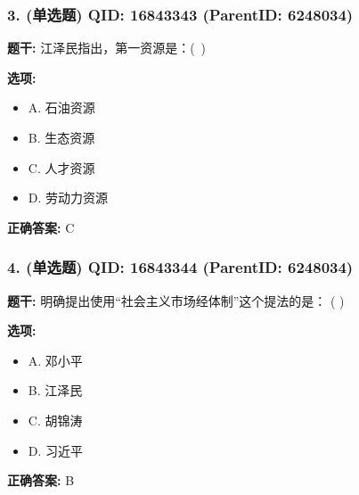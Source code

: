 \documentclass[12pt,UTF8]{ctexart}
\begin{document}
\vspace{0.3em}\hrulefill\vspace{0.7em}

\subsubsection*{3. (单选题) \small QID: 16843343 (ParentID: 6248034)}

\textbf{题干:}
江泽民指出，第一资源是：( )



\textbf{选项:}
\begin{itemize}[leftmargin=*]

  \item A. 石油资源

  \item B. 生态资源

  \item C. 人才资源

  \item D. 劳动力资源

\end{itemize}

\textbf{正确答案:}
C

\vspace{0.3em}\hrulefill\vspace{0.7em}

\subsubsection*{4. (单选题) \small QID: 16843344 (ParentID: 6248034)}

\textbf{题干:}
明确提出使用“社会主义市场经体制”这个提法的是： ( )



\textbf{选项:}
\begin{itemize}[leftmargin=*]

  \item A. 邓小平

  \item B. 江泽民

  \item C. 胡锦涛

  \item D. 习近平

\end{itemize}

\textbf{正确答案:}
B

\vspace{0.3em}\hrulefill\vspace{0.7em}
\end{document}
